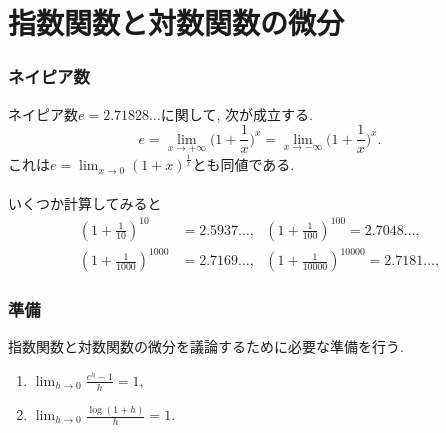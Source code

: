 
\section{指数関数と対数関数の微分}

\begin{frame}
\frametitle{ネイピア数}

ネイピア数$e=2.71828\dots$に関して, 次が成立する.  
$$
e=\lim_{x \to +\infty} \Big(1+\frac{1}{x}\Big)^x = \lim_{x \to -\infty} \Big(1+\frac{1}{x}\Big)^x. 
$$
これは$\displaystyle e=\lim_{x\to 0}(1+x)^\frac{1}{x}$とも同値である. \\
\ \\

いくつか計算してみると
\begin{align*}
(1+\frac{1}{10})^{10}&=2.5937\dots, \ \ \ 
(1+\frac{1}{100})^{100}=2.7048\dots, \\
(1+\frac{1}{1000})^{1000}&=2.7169\dots, \ \ \ 
(1+\frac{1}{10000})^{10000}=2.7181\dots, 
\end{align*}

\end{frame}







\begin{frame}
\frametitle{準備}

指数関数と対数関数の微分を議論するために必要な準備を行う. 

\begin{Thm} \label{準備2}
\begin{enumerate}
\item $\displaystyle \lim_{h \to 0} \frac{e^h-1}{h}=1$, 
\item  $\displaystyle \lim_{h \to 0} \frac{\log(1+h)}{h}=1$. 
\end{enumerate}
\end{Thm}


\end{frame}





